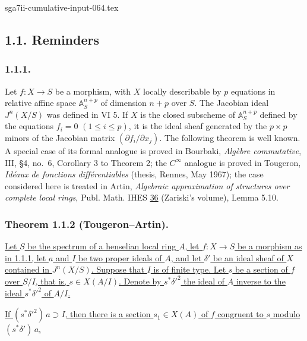 \begin{filecontents*}{sga7ii-cumulative-input-064.tex}
\subsection*{1.1. Reminders}

\subsubsection*{1.1.1.}
Let $f:X\longrightarrow S$ be a morphism, with $X$ locally
describable by $p$ equations in relative affine space
$\mathbb A_S^{n+p}$ of dimension $n+p$ over $S$.  The Jacobian ideal
$J^n(X/S)$ was defined in VI 5.  If $X$ is the closed subscheme of
$\mathbb A_S^{n+p}$ defined by the equations
$f_i=0$ $(1\leq i\leq p)$, it is the ideal sheaf generated by the
$p\times p$ minors of the Jacobian matrix
$(\partial f_i/\partial x_j)$.  The following theorem is well known.
A special case of its formal analogue is proved in Bourbaki,
\emph{Alg\`ebre commutative}, III, \S4, no.~6, Corollary 3 to
Theorem 2; the $C^\infty$ analogue is proved in Tougeron,
\emph{Id\'eaux de fonctions diff\'erentiables} (thesis, Rennes,
May 1967); the case considered here is treated in Artin,
\emph{Algebraic approximation of structures over complete local
rings}, Publ. Math. IHES \underline{36} (Zariski's volume),
Lemma 5.10.

\subsubsection*{Theorem 1.1.2 (Tougeron--Artin).}
\underline{Let $S$ be the spectrum of a henselian local ring $A$,
let $f:X\to S$ be a morphism as in 1.1.1, let $a$ and $I$ be two
proper ideals of $A$, and let $\delta'$ be an ideal sheaf of $X$
contained in $J^n(X/S)$.  Suppose that $I$ is of finite type.  Let
$s$ be a section of $f$ over $S/I$, that is, $s\in X(A/I)$.  Denote
by $s^*\delta'^2$ the ideal of $A$ inverse to the ideal
$s^*\delta'^2$ of $A/I$.}

\underline{If $(s^*\delta'^2)\,a\supset I$, then there is a section
$s_1\in X(A)$ of $f$ congruent to $s$ modulo
$(s^*\delta')\,a$.}


\end{filecontents*}
